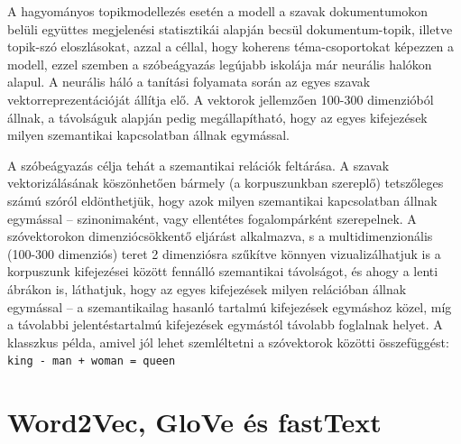 \documentclass[
]{book}
\begin{document}
A hagyományos topikmodellezés esetén a modell a szavak dokumentumokon
belüli együttes megjelenési statisztikái alapján becsül
dokumentum-topik, illetve topik-szó eloszlásokat, azzal a céllal, hogy
koherens téma-csoportokat képezzen a modell, ezzel szemben a
szóbeágyazás legújabb iskolája már neurális halókon alapul. A neurális
háló a tanítási folyamata során az egyes szavak vektorreprezentációját
állítja elő. A vektorok jellemzően 100-300 dimenzióból állnak, a
távolságuk alapján pedig megállapítható, hogy az egyes kifejezések
milyen szemantikai kapcsolatban állnak egymással.

A szóbeágyazás célja tehát a szemantikai relációk feltárása. A szavak
vektorizálásának köszönhetően bármely (a korpuszunkban szereplő)
tetszőleges számú szóról eldönthetjük, hogy azok milyen szemantikai
kapcsolatban állnak egymással -- szinonimaként, vagy ellentétes
fogalompárként szerepelnek. A szóvektorokon dimenziócsökkentő eljárást
alkalmazva, s a multidimenzionális (100-300 dimenziós) teret 2
dimenziósra szűkítve könnyen vizualizálhatjuk is a korpuszunk
kifejezései között fennálló szemantikai távolságot, és ahogy a lenti
ábrákon is, láthatjuk, hogy az egyes kifejezések milyen relációban
állnak egymással -- a szemantikailag hasanló tartalmú kifejezések
egymáshoz közel, míg a távolabbi jelentéstartalmú kifejezések egymástól
távolabb foglalnak helyet. A klasszkus példa, amivel jól lehet
szemléltetni a szóvektorok közötti összefüggést:
\texttt{king\ -\ man\ +\ woman\ =\ queen}

\hypertarget{word2vec-glove-uxe9s-fasttext}{%
\section{Word2Vec, GloVe és
fastText}\label{word2vec-glove-uxe9s-fasttext}}
\end{document}
